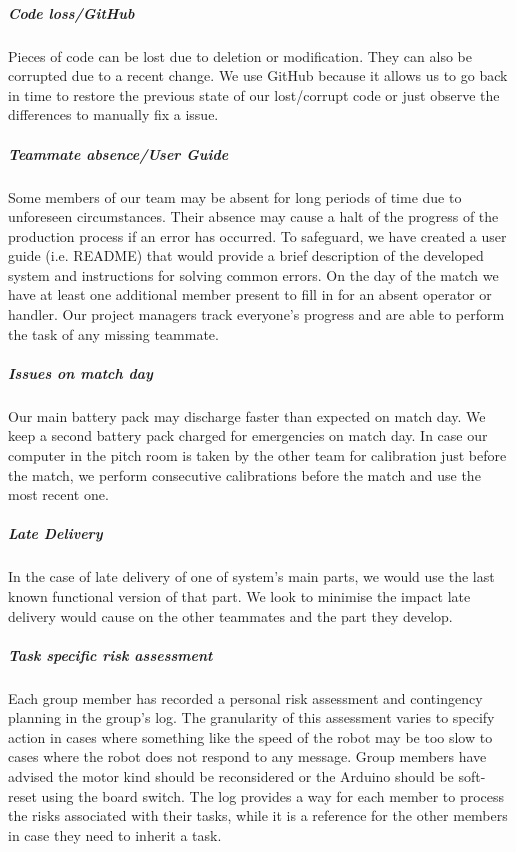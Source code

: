 \subparagraph{Code loss/GitHub}
Pieces of code can be lost due to deletion or modification. They can also be corrupted due to a recent change. We use GitHub because it allows us to go back in time to restore the previous state of our lost/corrupt code or just observe the differences to manually fix a issue.

\subparagraph{Teammate absence/User Guide}
Some members of our team may be absent for long periods of time due to unforeseen circumstances. Their absence may cause a halt of the progress of the production process if an error has occurred. To safeguard, we have created a user guide (i.e. README) that would provide a brief description of the developed system and  instructions for solving common errors. On the day of the match we have at least one additional member present to fill in for an absent operator or handler.  Our project managers track everyone's progress and are able to perform the task of any missing teammate. 

\subparagraph{Issues on match day}
Our main battery pack may discharge faster than expected on match day. We keep a second battery pack charged for emergencies on match day. In case our computer in the pitch room is taken by the other team for calibration just before the match, we perform consecutive calibrations before the match and use the most recent one.

\subparagraph{Late Delivery}
In the case of late delivery of one of system's main parts, we would use the last known functional version of that part. We look to minimise the impact late delivery would cause on the other teammates and the part they develop.

\subparagraph{Task specific risk assessment}
Each group member has recorded a personal risk assessment and contingency planning in the group's log. The granularity of this assessment varies to specify action in cases where something like the speed of the robot may be too slow to cases where the robot does not respond to any message. Group members have advised the motor kind should be reconsidered or the Arduino should be soft-reset using the board switch. The log provides a way for each member to process the risks associated with their tasks, while it is a reference for the other members in case they need to inherit a task.

\iffalse
key is hidden in safe place
have 2 code repos we have run - fred and craig's robot
what to do in budget inefficiency?
how to test if pitch is full?
IDEAS
Where should staff meet in the event the building is not accessible?
Who has the authority to close the business in the event of an emergency?
Which staff members are critical and must be on-site or always reachable?
Where are the back-ups and how are they restored?
Who can cover for each critical staff member?
Who are single points of failure and how can those risks be ameliorated?
What systems, vendors, and partners pose risk should they fail?
Who is responsible for communicating with customers, and how?
\fi